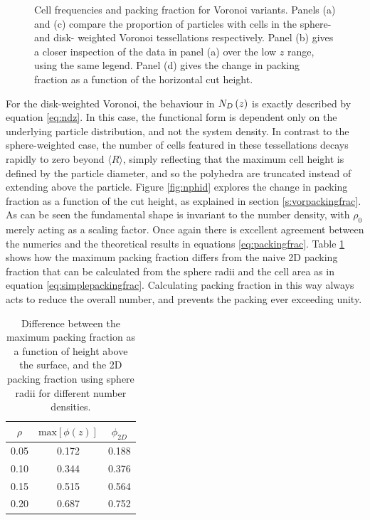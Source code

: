 \begin{figure}
	\caption{Cell frequencies and packing fraction for Voronoi variants. Panels (a) and (c) compare the proportion of particles with cells in the sphere\-- and disk\-- weighted Voronoi tessellations respectively.
	Panel (b) gives a closer inspection of the data in panel (a) over the low $z$ range, using the same legend.
	Panel (d) gives the change in packing fraction as a function of the horizontal cut height.}
	\label{fig:nphi}
\end{figure}

For the disk\--weighted Voronoi, the behaviour in $N_D\left(z\right)$ is exactly described by equation \eqref{eq:ndz}.
In this case, the functional form is dependent only on the underlying particle distribution, and not the system density. 
In contrast to the sphere\--weighted case, the number of cells featured in these tessellations decays rapidly to zero beyond $\langle R\rangle$, simply reflecting that the maximum cell height is defined by the particle diameter, and so the polyhedra are truncated instead of extending above the particle.
Figure \ref{fig:nphid} explores the change in packing fraction as a function of the cut height, as explained in section \ref{s:vorpackingfrac}.
As can be seen the fundamental shape is invariant to the number density, with $\rho_0$ merely acting as a scaling factor. 
Once again there is excellent agreement between the numerics and the theoretical results in equations \eqref{eq:packingfrac}.
Table \ref{tab:packingfrac} shows how the maximum packing fraction differs from the naive 2D packing fraction that can be calculated from the sphere radii and the cell area as in equation \eqref{eq:simplepackingfrac}.
Calculating packing fraction in this way always acts to reduce the overall number, and prevents the packing ever exceeding unity.

\begin{table}[h]
\caption{Difference between the maximum packing fraction as a function of height above the surface, and the 2D packing fraction using sphere radii for different number densities.}
\label{tab:packingfrac}
\centering
\begin{tabular}{ccc}
	\toprule
        $\rho$ & $\text{max}\left[\phi\left(z\right)\right]$ & $\phi_{2D}$ \\
        \midrule
	0.05 & 0.172 & 0.188 \\
	0.10 & 0.344 & 0.376 \\
	0.15 & 0.515 & 0.564 \\
	0.20 & 0.687 & 0.752 \\
	\bottomrule
\end{tabular}
\end{table}


